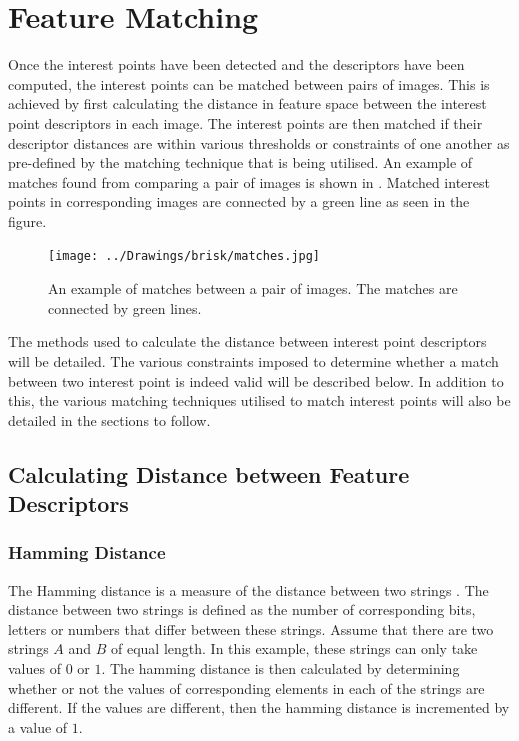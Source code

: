 \chapter{Feature Matching}
\label{sec:matching}
Once the interest points have been detected and the descriptors have been computed, the interest points can be matched between pairs of images. This is achieved by first calculating the distance in feature space between the interest point descriptors in each image. The interest points are then matched if their descriptor distances are within various thresholds or constraints of one another as pre-defined by the matching technique that is being utilised. An example of matches found from comparing a pair of images is shown in . Matched interest points in corresponding images are connected by a green line as seen in the figure.\\

\begin{figure}[h!] 
  \centering
    \texttt{[image: ../Drawings/brisk/matches.jpg]}
    \caption{An example of matches between a pair of images. The matches are connected by green lines.}
    \label{fig:matchesIntro}
\end{figure}

The methods used to calculate the distance between interest point descriptors will be detailed. The various constraints imposed to determine whether a match between two interest point is indeed valid will be described below. In addition to this, the various matching techniques utilised to match interest points will also be detailed in the sections to follow.\\

\section{Calculating Distance between Feature Descriptors}
\label{sec:distance}

\subsection{Hamming Distance}
\label{sec:hamming}
The Hamming distance is a measure of the distance between two strings \cite{Banzal2007}. The distance between two strings is defined as the number of corresponding bits, letters or numbers that differ between these strings. Assume that there are two strings $A$ and $B$ of equal length. In this example, these strings can only take values of $0$ or $1$. The hamming distance is then calculated by determining whether or not the values of corresponding elements in each of the strings are different. If the values are different, then the hamming distance is incremented by a value of $1$.\\


